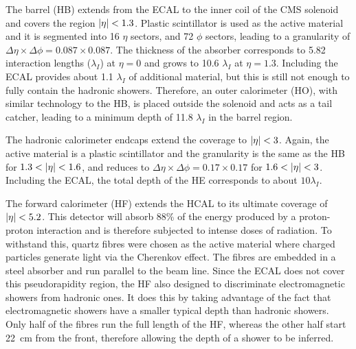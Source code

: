 The barrel (HB) extends from the ECAL to the inner coil of the CMS solenoid and covers the region $\lvert \eta \rvert < 1.3$. Plastic scintillator is used as the active material and it is segmented into 16 $\eta$ sectors, and 72 $\phi$ sectors, leading to a granularity of $\Delta\eta \times \Delta\phi = 0.087 \times 0.087$. The thickness of the absorber corresponds to 5.82 interaction lengths ($\lambda_I$) at $\eta = 0$ and grows to 10.6 $\lambda_I$ at $\eta = 1.3$. Including the ECAL provides about 1.1 $\lambda_I$ of additional material, but this is still not enough to fully contain the hadronic showers. Therefore, an outer calorimeter (HO), with similar technology to the HB, is placed outside the solenoid and acts as a tail catcher, leading to a minimum depth of 11.8 $\lambda_I$ in the barrel region.

The hadronic calorimeter endcaps extend the coverage to $\lvert \eta \rvert < 3$. Again, the active material is a plastic scintillator and the granularity is the same as the HB for $1.3 < \lvert \eta \rvert < 1.6$, and reduces to $\Delta\eta \times \Delta\phi = 0.17 \times 0.17$ for $1.6 < \lvert \eta \rvert < 3$. Including the ECAL, the total depth of the HE corresponds to about $10\lambda_I$.

The forward calorimeter (HF) extends the HCAL to its ultimate coverage of $\lvert \eta \rvert < 5.2$. This detector will absorb 88\% of the energy produced by a proton-proton interaction and is therefore subjected to intense doses of radiation. To withstand this, quartz fibres were chosen as the active material where charged particles generate light via the Cherenkov effect. The fibres are embedded in a steel absorber and run parallel to the beam line. Since the ECAL does not cover this pseudorapidity region, the HF also designed to discriminate electromagnetic showers from hadronic ones. It does this by taking advantage of the fact that electromagnetic showers have a smaller typical depth than hadronic showers. Only half of the fibres run the full length of the HF, whereas the other half start 22~\unit{cm} from the front, therefore allowing the depth of a shower to be inferred.
